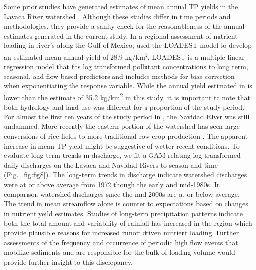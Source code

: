 \documentclass[fleqn,10pt,lineno]{wlpeerj} %
\begin{document}
Some prior studies have generated estimates of mean annual TP yields in
the Lavaca River watershed
\autocites[Table~\ref{tab:table5},][]{dunnTrendsNutrientInflows1996,rebichSourcesDeliveryNutrients2011,omaniEstimationSedimentNutrient2014,wise_spatially_2019}.
Although these studies differ in time periods and methodologies, they
provide a sanity check for the reasonableness of the annual estimates
generated in the current study. In a regional assessment of nutrient
loading in river's along the Gulf of Mexico,
\textcite{dunnTrendsNutrientInflows1996} used the LOADEST model to
develop an estimated mean annual yield of 28.9 kg/km\textsuperscript{2}.
LOADEST is a multiple linear regression model that fits log transformed
pollutant concentrations to long term, seasonal, and flow based
predictors and includes methods for bias correction when exponentiating
the response variable. While the annual yield estimated in
\textcite{dunnTrendsNutrientInflows1996} is lower than the estimate of
35.2 kg/km\textsuperscript{2} in this study, it is important to note
that both hydrology and land use was different for a proportion of the
study period. For almost the first ten years of the study period in
\textcite{dunnTrendsNutrientInflows1996}, the Navidad River was still
undammed. More recently the eastern portion of the watershed has seen
large conversions of rice fields to more traditional row crop production
\autocite{kulatHolisticWaterEnergyFoodNexus2019}. The apparent increase
in mean TP yield might be suggestive of wetter recent conditions. To
evaluate long-term trends in discharge, we fit a GAM relating
log-transformed daily discharges on the Lavaca and Navidad Rivers to
season and time (Fig.~\ref{fig:fig8}). The long-term trends in discharge
indicate watershed discharges were at or above average from 1972 though
the early and mid-1980s. In comparison watershed discharges since the
mid-2000s are at or below average. The trend in mean streamflow alone is
counter to expectations based on changes in nutrient yeild estimates.
Studies of long-term precipitation patterns indicate both the total
amount \autocite{dixonTrendDetectionTexas2011} and variability of
rainfall
\autocite{mishraChangesExtremePrecipitation2010,fagnantCharacterizingSpatiotemporalTrends2020}
has increased in the region which provide plausible reasons for
increased runoff driven nutrient loading. Further assessments of the
frequency and occurrence of periodic high flow events that mobilize
sediments and are responsible for the bulk of loading volume would
provide further insight to this discrepancy.
\end{document}
